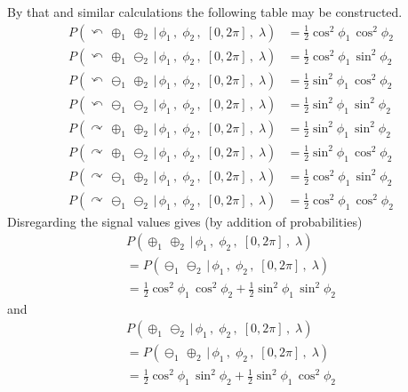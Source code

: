 \documentclass[9pt,technote]{IEEEtran}
\begin{document}
By that and similar calculations the following table may be
constructed.
\begin{align}
  P(\curvearrowleft\,\oplus_1\,\oplus_2\,|\,\phi_1\,,\; \phi_2\,,\; [0,2\pi]\,,\; \lambda) &= \frac{1}{2} \cos^2 \phi_1\, \cos^2 \phi_2 \\
  P(\curvearrowleft\,\oplus_1\,\ominus_2\,|\,\phi_1\,,\; \phi_2\,,\; [0,2\pi]\,,\; \lambda) &= \frac{1}{2} \cos^2 \phi_1\, \sin^2 \phi_2 \\
  P(\curvearrowleft\,\ominus_1\,\oplus_2\,|\,\phi_1\,,\; \phi_2\,,\; [0,2\pi]\,,\; \lambda) &= \frac{1}{2} \sin^2 \phi_1\, \cos^2 \phi_2 \\
  P(\curvearrowleft\,\ominus_1\,\ominus_2\,|\,\phi_1\,,\; \phi_2\,,\; [0,2\pi]\,,\; \lambda) &= \frac{1}{2} \sin^2 \phi_1\, \sin^2 \phi_2 \\
  P(\curvearrowright\,\oplus_1\,\oplus_2\,|\,\phi_1\,,\; \phi_2\,,\; [0,2\pi]\,,\; \lambda) &= \frac{1}{2} \sin^2 \phi_1\, \sin^2 \phi_2 \\
  P(\curvearrowright\,\oplus_1\,\ominus_2\,|\,\phi_1\,,\; \phi_2\,,\; [0,2\pi]\,,\; \lambda) &= \frac{1}{2} \sin^2 \phi_1\, \cos^2 \phi_2 \\
  P(\curvearrowright\,\ominus_1\,\oplus_2\,|\,\phi_1\,,\; \phi_2\,,\; [0,2\pi]\,,\; \lambda) &= \frac{1}{2} \cos^2 \phi_1\, \sin^2 \phi_2 \\
  P(\curvearrowright\,\ominus_1\,\ominus_2\,|\,\phi_1\,,\; \phi_2\,,\; [0,2\pi]\,,\; \lambda) &= \frac{1}{2} \cos^2 \phi_1\, \cos^2 \phi_2
\end{align}
Disregarding the signal values gives (by addition of probabilities)
\begin{multline}
  \label{coscos}
  P(\oplus_1\,\oplus_2\,|\,\phi_1\,,\; \phi_2\,,\; [0,2\pi]\,,\; \lambda) \\
  = P(\ominus_1\,\ominus_2\,|\,\phi_1\,,\; \phi_2\,,\; [0,2\pi]\,,\; \lambda) \\
  = \frac{1}{2} \cos^2 \phi_1\, \cos^2 \phi_2 + \frac{1}{2} \sin^2 \phi_1\, \sin^2 \phi_2
\end{multline}
and
\begin{multline}
  \label{cossin}
  P(\oplus_1\,\ominus_2\,|\,\phi_1\,,\; \phi_2\,,\; [0,2\pi]\,,\; \lambda) \\
  = P(\ominus_1\,\oplus_2\,|\,\phi_1\,,\; \phi_2\,,\; [0,2\pi]\,,\; \lambda) \\
  = \frac{1}{2} \cos^2 \phi_1\, \sin^2 \phi_2 + \frac{1}{2} \sin^2 \phi_1\, \cos^2 \phi_2
\end{multline}
\end{document}
